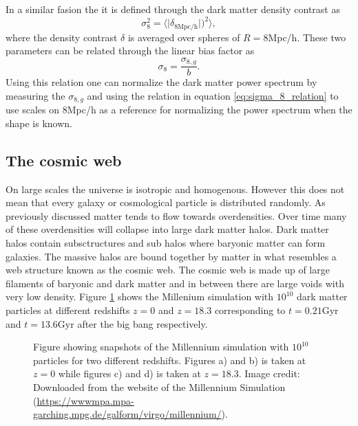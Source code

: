 In a similar fasion the it is defined through the dark matter density contrast as
\begin{equation}
    \sigma_8^2=\Big\langle\vert\delta_{8\mathrm{Mpc/h}}\vert\Big)^2\Big\rangle,
\end{equation}
where the density contrast $\delta$ is averaged over spheres of $R=8$Mpc/h.
These two parameters can be related through the linear bias factor as
\begin{equation}\label{eq:sigma_8_relation}
    \sigma_8=\frac{\sigma_{8,g}}{b}.
\end{equation}
Using this relation one can normalize the dark matter power spectrum by measuring the $\sigma_{8,g}$ and using the relation in equation \ref{eq:sigma_8_relation} to use scales on $8$Mpc/h as a reference for normalizing the power spectrum when the shape is known.
\subsection{The cosmic web}
On large scales the universe is isotropic and homogenous. However this does not
mean that every galaxy or cosmological particle is distributed randomly. As
previously discussed matter tends to flow towards overdensities. Over time many
of these overdensities will collapse into large dark matter halos. Dark matter
halos contain subsctructures and sub halos where baryonic matter can form
galaxies. The massive halos are bound together by matter in what resembles a
web structure known as the cosmic web. The cosmic web is made up of large
filaments of baryonic and dark matter and in between there are large voids with
very low density. Figure \ref{fig:millenium} shows the Millenium simulation with
$10^{10}$ dark matter particles at different redshifts $z=0$ and $z=18.3$ corresponding to
$t=0.21$Gyr and $t=13.6$Gyr after the big bang respectively.
\begin{figure}[htbp]\label{fig:millenium}
    \hspace{1em}%
    \hspace{1em}%
    \caption{Figure showing snapshots of the Millennium simulation with $10^{10}$ particles
    for two different redshifts. Figures a) and b) is taken at $z=0$ while
    figures c) and d) is taken at $z=18.3$. Image credit: Downloaded from the
    website of the Millennium Simulation\cite{Millennium} (\url{https://wwwmpa.mpa-garching.mpg.de/galform/virgo/millennium/}).}
\end{figure}
